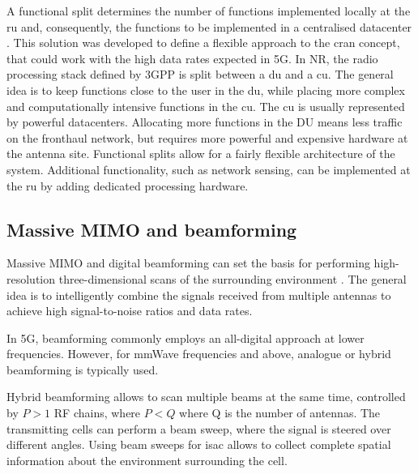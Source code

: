 	A functional split determines the number of functions implemented locally at the \gls{ru} and, consequently, the functions to be implemented in a centralised datacenter \cite{Larsen_Checko_Christiansen_2019}. 
 	This solution was developed to define a flexible approach to the \gls{cran} concept, that could work with the high data rates expected in 5G. 
	In \gls{NR}, the radio processing stack defined by \gls{3GPP} is split between a \gls{du} and a \gls{cu}. 
	The general idea is to keep functions close to the user in the \gls{du}, while placing more complex and computationally intensive functions in the \gls{cu}. The \gls{cu} is usually represented by powerful datacenters.
	Allocating more functions in the DU means less traffic on the fronthaul network, but requires more powerful and expensive hardware at the antenna site.
	Functional splits allow for a fairly flexible architecture of the system. Additional functionality, such as network sensing, can be implemented at the \gls{ru} by adding dedicated processing hardware.

	 
	
	\subsection{Massive MIMO and beamforming}
	
	Massive MIMO and digital beamforming can set the basis for performing high-resolution three-dimensional scans of the surrounding environment \cite{MIMO-next-gen}.
	The general idea is to intelligently combine the signals received from multiple antennas to achieve high signal-to-noise ratios and data rates.
	
	In \gls{5G}, beamforming commonly employs an all-digital approach at lower frequencies. However, for mmWave frequencies and above, analogue or hybrid beamforming is typically used. 
	
	Hybrid beamforming allows to scan multiple beams at the same time, controlled by $P >1$ RF chains, where $P < Q$ where Q is the number of antennas. 
	The transmitting cells can perform a beam sweep, where the signal is steered over different angles. 
	Using beam sweeps for \gls{isac} allows to collect complete spatial information about the environment surrounding the cell.
	
